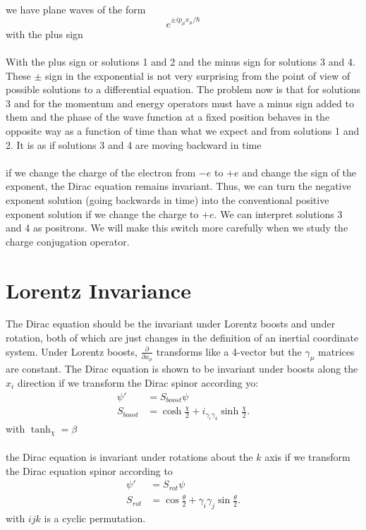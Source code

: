 \documentclass{report}
\begin{document}
\\
\\
\\
we have plane waves of the form
\begin{equation}
	e^{\pm i p_{\mu}x_{\mu} / \hbar}
\end{equation}
with the plus sign \\
\\
With the plus sign or solutions 1 and 2 and the minus sign for solutions 3 and 4. These $\pm$ sign in the exponential is not very surprising from the point of view of possible solutions to a differential equation. The problem now is that for solutions 3 and for the momentum and energy operators must have a minus sign added to them and the phase of the wave function at a fixed position behaves in the opposite way as a function of time than what we expect and from solutions 1 and 2. It is as if solutions 3 and 4 are moving backward in time \\
\\
if we change the charge of the electron from $ - e$ to  $+e$ and change the sign of the exponent, the Dirac equation remains invariant. Thus, we can turn the negative exponent solution (going backwards in time) into the conventional positive exponent solution if we change the charge to $+e$. We can interpret solutions 3 and 4 as positrons. We will make this switch more carefully when we study the charge conjugation operator.

\section{Lorentz Invariance}
The Dirac equation should be the invariant under Lorentz boosts and under rotation, both of which are just changes in the definition of an inertial coordinate system. Under Lorentz boosts, $\displaystyle   \frac{ \partial }{ \partial x_{\mu} } $ transforms like a 4-vector but the $\displaystyle \gamma_{\mu}$ matrices are constant. The Dirac equation is shown to be invariant under boosts along the $\displaystyle x_{i}$ direction if we transform the Dirac spinor according yo:
\begin{align*}
	\psi'     & = S_{boost}\psi                                                     \\
	S_{boost} & = \cosh \frac{\chi}{2} + i_{\gamma_{i}\gamma_4}\sinh \frac{\chi}{2}
	.\end{align*}
with $\displaystyle \tanh_{\chi} = \beta$
\\
\\
the Dirac equation is invariant under rotations about the $k$ axis if we transform the Dirac equation spinor according to
\begin{align*}
	\psi'   & = S_{rot} \psi                                                      \\
	S_{rot} & = \cos \frac{\theta}{2} + \gamma_{i}\gamma_{j}\sin \frac{\theta}{2}
	.\end{align*}
with $ijk$ is a cyclic permutation.
\\
\end{document}
